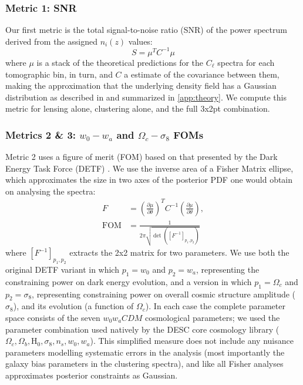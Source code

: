 \documentclass[twocolumn,twocolappendix]{aastex63}
\begin{document}
\subsubsection{Metric 1: SNR}

Our first metric is the total signal-to-noise ratio (SNR) of the power spectrum derived from the assigned
$n_i(z)$ values:
\begin{equation}
    S = \mu^{T} C^{-1} \mu
\label{eq:snr}
\end{equation}
where $\mu$ is a stack of the theoretical predictions for the $C_\ell$ spectra for each tomographic 
bin, in turn, and $C$ a estimate of the covariance between them, making the approximation that the underlying density field has a Gaussian distribution as described in
\citet{takada_jain} and summarized in \autoref{app:theory}.   We compute this metric for lensing alone, clustering alone, and the full 3x2pt combination.

\subsubsection{Metrics 2 \& 3: $w_{0}-w_{a}$ and $\Omega_c-\sigma_8$ FOMs}

Metric 2 uses a figure of merit (FOM) based on that presented by the Dark Energy Task Force (DETF) \citep{detf}.  We 
use the inverse area of a Fisher Matrix ellipse, which approximates the size in two axes 
of the posterior PDF one would obtain on analysing the spectra:
\begin{align}
    F &= \left( \frac{\partial \mu}{\partial \theta} \right)^T C^{-1} \left( \frac{\partial \mu}{\partial \theta} \right), \\
    \mathrm{FOM} &= \frac{1}{2 \pi \sqrt{\det{([F^{-1}]_{p_1, p_2})}}}
\label{eq:fom}
\end{align}
where $[F^{-1}]_{p_1, p_2}$ extracts the 2x2 matrix for two parameters.  We use both the original
DETF variant in which $p_1 = w_0$ and $p_2 = w_a$, representing the constraining power on dark energy 
evolution, and a version in which $p_1 = \Omega_c$ and $p_2 = \sigma_8$, representing constraining
power on overall cosmic structure amplitude ($\sigma_8$), and its evolution (a function of $\Omega_c$). In each case the complete parameter space consists
of the seven $w_0w_aCDM$ cosmological parameters; we used the parameter combination used natively by the DESC core cosmology library \citep{ccl} ($\Omega_c, \Omega_b, \mathrm{H}_0, \sigma_8, n_s, w_0, w_a$). This simplified measure does not include any nuisance
parameters modelling systematic errors in the analysis (most importantly the galaxy bias parameters in the clustering 
spectra), and like all Fisher analyses approximates posterior constraints as Gaussian. 
\end{document}
